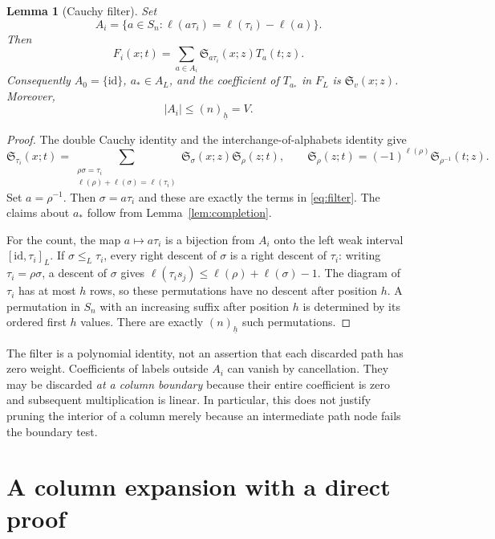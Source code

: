 \documentclass{amsart}
\newtheorem{lemma}[theorem]{Lemma}
\theoremstyle{definition}
\theoremstyle{remark}
\numberwithin{equation}{section}
\newcommand{\Sch}{\mathfrak S}
\newcommand{\id}{\mathrm{id}}
\newcommand{\fall}[2]{(#1)_{\underline{#2}}}
\begin{document}
\begin{lemma}[Cauchy filter]\label{lem:filter}
Set
\[
 A_i=\{a\in S_n:\ell(a\tau_i)=\ell(\tau_i)-\ell(a)\}.
\]
Then
\begin{equation}\label{eq:filter}
 F_i(x;t)=\sum_{a\in A_i}\Sch_{a\tau_i}(x;z)T_a(t;z).
\end{equation}
Consequently $A_0=\{\id\}$, $a_*\in A_L$, and the coefficient of
$T_{a_*}$ in $F_L$ is $\Sch_v(x;z)$.
Moreover,
\begin{equation}\label{eq:labelcount}
 |A_i|\leq \fall{n}{h}=V.
\end{equation}
\end{lemma}
\begin{proof}
The double Cauchy identity and the interchange-of-alphabets identity give
\[
 \Sch_{\tau_i}(x;t)
 =\sum_{\substack{\rho\sigma=\tau_i\\ \ell(\rho)+\ell(\sigma)=\ell(\tau_i)}}
       \Sch_\sigma(x;z)\Sch_\rho(z;t),\qquad
 \Sch_\rho(z;t)=(-1)^{\ell(\rho)}\Sch_{\rho^{-1}}(t;z).
\]
Set $a=\rho^{-1}$. Then $\sigma=a\tau_i$ and these are exactly
the terms in \eqref{eq:filter}.
The claims about $a_*$ follow from Lemma~\ref{lem:completion}.

For the count, the map $a\mapsto a\tau_i$ is a bijection from $A_i$
onto the left weak interval $[\id,\tau_i]_L$.
If $\sigma\leq_L\tau_i$, every right descent of $\sigma$ is a
right descent of $\tau_i$: writing $\tau_i=\rho\sigma$,
a descent of $\sigma$ gives
$\ell(\tau_i s_j)\leq\ell(\rho)+\ell(\sigma)-1$.
The diagram of $\tau_i$ has at most $h$ rows, so these permutations
have no descent after position $h$.
A permutation in $S_n$ with an increasing suffix after position $h$
is determined by its ordered first $h$ values.
There are exactly $\fall{n}{h}$ such permutations.
\end{proof}

The filter is a polynomial identity, not an assertion that each discarded
path has zero weight. Coefficients of labels outside $A_i$ can vanish by
cancellation. They may be discarded \emph{at a column boundary} because
their entire coefficient is zero and subsequent multiplication is linear.
In particular, this does not justify pruning the interior of a column
merely because an intermediate path node fails the boundary test.

\section{A column expansion with a direct proof}\label{sec:columns}
\end{document}
